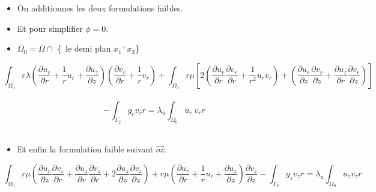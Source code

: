 \documentclass[french]{beamer}
\begin{document}
\begin{frame}

 \begin{itemize}
   \item  On additionnes les deux formulations faibles.
   \item  Et pour simplifier $\phi = 0$. 
   \item $\Omega_0 = \Omega \cap $ \{\ le demi plan ${x_1}^{+} x_3$\}\ \\
  \end{itemize}
\pause
   \begin{tiny}
$$\int_{\Omega_0} r \lambda (\frac{\partial u_r}{\partial r} + \frac{1}{r} u_r + \frac{\partial u_z}{\partial z}) (\frac{\partial v_r}{\partial r} + \frac{1}{r} v_r) + \int_{\Omega_0} r \mu \left[ 2 \left(\frac{\partial u_r}{\partial r}\frac{\partial v_r}{\partial r} + \frac{1}{r^2} u_r v_r\right) +  \left(\frac{\partial u_r}{\partial z}\frac{\partial v_r}{\partial z} + \frac{\partial u_z}{\partial r}\frac{\partial v_r}{\partial z}\right)\right]$$ \\
$$ - \int_{\Gamma_2} g_r v_r r = \lambda_u \int_{\Omega_0} u_r\ v_r r $$ \\ 

   \end{tiny}
\end{frame}

\begin{frame}

 \begin{itemize}
   \item  Et enfin la formulation faible suivant $\vec {oz}$:
  \end{itemize}

   \begin{tiny}
$$\int_{\Omega_0} r \mu (\frac{\partial u_{r}}{\partial z}\frac{\partial v_{z}}{\partial r} + \frac{\partial u_{z}}{\partial r}\frac{\partial v_{z}}{\partial r} + 2 
\frac{\partial u_{z}}{\partial z}\frac{\partial v_{z}}{\partial z}) +
r\mu(\frac{\partial u_{r}}{\partial r}+ \frac{1}{r} u_{r} + \frac{\partial u_{z}}{\partial z}) \frac{\partial v_{z}}{\partial z}
-\int_{\Gamma_{2}} g_{z}v_{z}r  
= \lambda_u \int_{\Omega_0} u_{z}v_{z}r$$
   \end{tiny}

\end{frame}
\end{document}
